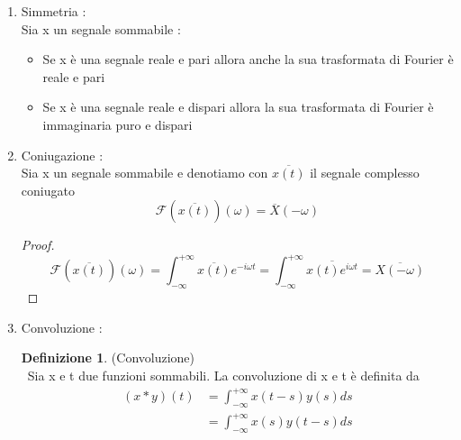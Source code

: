 \documentclass{article}
\theoremstyle{definition}
\newtheorem*{definizione}{Definizione}
\newcommand{\intinf}{\int_{-\infty}^{+\infty}}
\newcommand{\f}{\mathscr{F}}
\begin{document}
\begin{enumerate}
	\begin{itemize}
\item Derivata nel tempo : \\
Sia x un segnale sommabile , derivabile e tale che $x'(t)$ è sommabile
$$\f(x'(t))(\omega)=i\omega X(\omega )$$
\begin{proof}
	$$\hat{x}'(\omega)=\intinf x'(t)e^{-i\omega t}=x(t)e^{-i\omega t} + i \omega \intinf x(t)e^{-i\omega t}=i\omega \hat{x}(\omega )$$
\end{proof}
\item Derivata nella frequenza : \\
Se x è un segnale sommabile e anche $tx(t)$ è anche sommabile allora 
$$\frac{d}{d\omega} \widehat{x}(\omega)=\f(-itx(t))(\omega)$$
\begin{proof}
	$$\frac{d}{d \omega}\widehat{x}(\omega)= \frac{d}{d \omega} \intinf x(t)e^{-i\omega t}=\intinf \frac{d}{d \omega} x(t)e^{-i\omega t}=\intinf -it x(t)e^{-i\omega t}$$
\end{proof}
\end{itemize}
	\item Simmetria : \\
	Sia x un segnale sommabile : 
	\begin{itemize}
		\item Se x è una segnale reale e pari allora anche la sua trasformata di Fourier è reale e pari 
		\item Se x è una segnale reale e dispari allora la sua trasformata di Fourier è immaginaria puro e dispari 
	\end{itemize}
	\item Coniugazione : \\
	Sia x un segnale sommabile e denotiamo con $\overline{x(t)}$ il segnale complesso coniugato  
	$$\f(\overline{x(t)})(\omega)= \overline{X}(-\omega)$$
	\begin{proof}
	$$	\f(\overline{x(t)})(\omega)=\intinf \overline{x(t)}e^{-i\omega t}=\intinf \overline{x(t)e^{i\omega t}}=\overline{X(-\omega)}$$
	\end{proof}
	\item Convoluzione : 
	\begin{definizione}(Convoluzione)\\\
		Sia x e t due funzioni sommabili. La convoluzione di x e t è definita da 
		\begin{align*}
			(x *y)(t) &= \intinf x(t-s) y(s)ds \\
			&= \intinf x(s)y(t-s)ds
		\end{align*}
	\end{definizione}

\end{enumerate}
\end{document}
